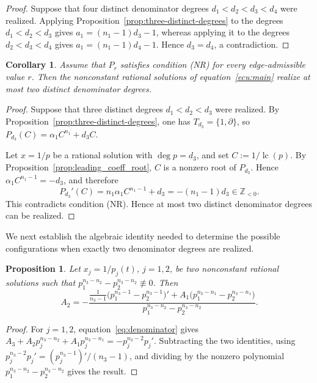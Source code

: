 \documentclass[12pt,a4paper]{amsart}
\numberwithin{theorem}{section}
\newtheorem{proposition}[theorem]{Proposition}
\newtheorem{corollary}[theorem]{Corollary}
\theoremstyle{definition}
\begin{document}
	\begin{proof}
		Suppose that four distinct denominator degrees $d_1<d_2<d_3<d_4$ were realized. Applying Proposition~\ref{prop:three-distinct-degrees} to the degrees $d_1<d_2<d_3$ gives $a_1=(n_1-1)d_3-1$, whereas applying it to the degrees $d_2<d_3<d_4$ gives $a_1=(n_1-1)d_4-1$. Hence $d_3=d_4$, a contradiction.
	\end{proof}
	
	\begin{corollary}\label{cor:at-most-two-degrees}
		Assume that $P_r$ satisfies condition {\rm (NR)} for every edge-admissible value $r$. Then the nonconstant rational solutions of equation~\eqref{ecu:main} realize at most two distinct denominator degrees.
	\end{corollary}
	
	\begin{proof}
		Suppose that three distinct degrees $d_1<d_2<d_3$ were realized. By Proposition~\ref{prop:three-distinct-degrees}, one has $T_{d_3}=\{1,\partial\}$, so $P_{d_3}(C)=\alpha_1C^{n_1}+d_3C$.
		
		Let $x=1/p$ be a rational solution with $\deg p=d_3$, and set $C:=1/\operatorname{lc}(p)$. By Proposition~\ref{prop:leading_coeff_root}, $C$ is a nonzero root of $P_{d_3}$. Hence $\alpha_1C^{n_1-1}=-d_3$, and therefore
		\[
		P_{d_3}'(C)=n_1\alpha_1C^{n_1-1}+d_3=-(n_1-1)d_3\in\mathbb Z_{<0}.
		\]
		This contradicts condition {\rm (NR)}. Hence at most two distinct denominator degrees can be realized.
	\end{proof}
	
	We next establish the algebraic identity needed to determine the possible configurations when exactly two denominator degrees are realized.
	
	\begin{proposition}\label{prop:two-solutions-identity}
		Let $x_j=1/p_j(t)$, $j=1,2$, be two nonconstant rational solutions such that $p_1^{n_3-n_2}-p_2^{n_3-n_2}\not\equiv0$. Then
		\[
		A_2=-\frac{\frac{1}{n_3-1}\bigl(p_1^{n_3-1}-p_2^{n_3-1}\bigr)'+A_1\bigl(p_1^{n_3-n_1}-p_2^{n_3-n_1}\bigr)}{p_1^{n_3-n_2}-p_2^{n_3-n_2}}.
		\]
	\end{proposition}
	
	\begin{proof}
		For $j=1,2$, equation~\eqref{eq:denominator} gives $A_3+A_2p_j^{n_3-n_2}+A_1p_j^{n_3-n_1}=-p_j^{n_3-2}p_j'$. Subtracting the two identities, using $p_j^{n_3-2}p_j'=(p_j^{n_3-1})'/(n_3-1)$, and dividing by the nonzero polynomial $p_1^{n_3-n_2}-p_2^{n_3-n_2}$ gives the result.
	\end{proof}
	
\end{document}
